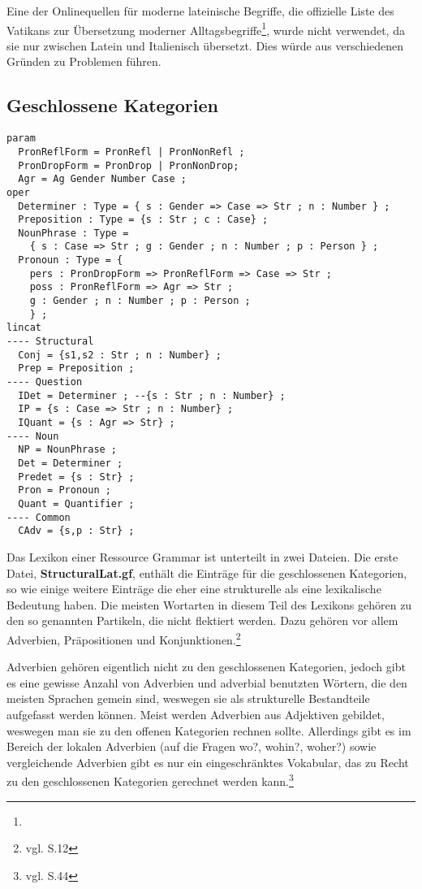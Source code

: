 Eine der Onlinequellen für moderne lateinische Begriffe, die offizielle Liste des Vatikans zur Übersetzung moderner Alltagsbegriffe\footnote{\vatlatinitas}, wurde nicht verwendet, da sie nur zwischen Latein und Italienisch übersetzt. Dies würde aus verschiedenen Gründen zu Problemen führen.
\subsection{Geschlossene Kategorien}
\label{subsec:geschlossene}
\begin{lstlisting}[float=h!tp,caption={Für \textbf{StructuralLat.gf} nötige \texttt{lincat}-Definitionen für geschlossene Kategorien},label={GF-Structural-Lincat},basicstyle=\small]
param
  PronReflForm = PronRefl | PronNonRefl ;
  PronDropForm = PronDrop | PronNonDrop;
  Agr = Ag Gender Number Case ;
oper
  Determiner : Type = { s : Gender => Case => Str ; n : Number } ;
  Preposition : Type = {s : Str ; c : Case} ;
  NounPhrase : Type = 
    { s : Case => Str ; g : Gender ; n : Number ; p : Person } ;
  Pronoun : Type = {
    pers : PronDropForm => PronReflForm => Case => Str ;
    poss : PronReflForm => Agr => Str ;
    g : Gender ; n : Number ; p : Person ;
    } ;
lincat
---- Structural
  Conj = {s1,s2 : Str ; n : Number} ;
  Prep = Preposition ;
---- Question
  IDet = Determiner ; --{s : Str ; n : Number} ;
  IP = {s : Case => Str ; n : Number} ;
  IQuant = {s : Agr => Str} ;
---- Noun
  NP = NounPhrase ;
  Det = Determiner ;
  Predet = {s : Str} ;
  Pron = Pronoun ;
  Quant = Quantifier ;
---- Common
  CAdv = {s,p : Str} ; 
\end{lstlisting}
Das Lexikon einer Ressource Grammar ist unterteilt in zwei Dateien. Die erste Datei, \textbf{StructuralLat.gf}, enthält die Einträge für die geschlossenen Kategorien, so wie einige weitere Einträge die eher eine strukturelle als eine lexikalische Bedeutung haben. Die meisten Wortarten in diesem Teil des Lexikons gehören zu den so genannten Partikeln, die nicht flektiert werden. Dazu gehören vor allem Adverbien, Präpositionen und Konjunktionen.\footnote{vgl. \cite{BAYER-LINDAUER1994} S.12} \par
Adverbien gehören eigentlich nicht zu den geschlossenen Kategorien, jedoch gibt es eine gewisse Anzahl von Adverbien und adverbial benutzten Wörtern, die den meisten Sprachen gemein sind, weswegen sie als strukturelle Bestandteile aufgefasst werden können. Meist werden Adverbien aus Adjektiven gebildet, weswegen man sie zu den offenen Kategorien rechnen sollte. Allerdings gibt es im  Bereich der lokalen Adverbien (auf die Fragen wo?, wohin?, woher?) sowie vergleichende Adverbien gibt es nur ein eingeschränktes Vokabular, das zu Recht zu den geschlossenen Kategorien gerechnet werden kann.\footnote{vgl. \cite{BAYER-LINDAUER1994} S.44} 
